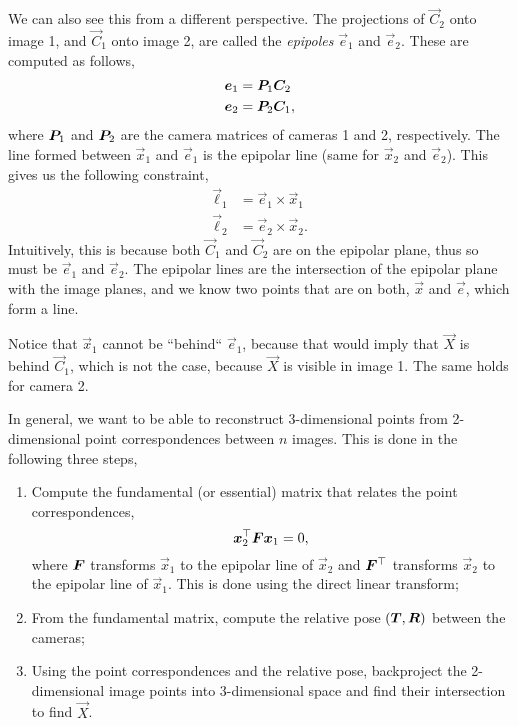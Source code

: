 We can also see this from a different perspective. The projections of
$\vec{C}_2$ onto image 1, and $\vec{C}_1$ onto image 2, are called the
\textit{epipoles} $\vec{e}_1$ and $\vec{e}_2$. These are computed as follows,
\begin{align*}
    \bm{e}_1 & = \bm{P}_1 \bm{C}_2  \\
    \bm{e}_2 & = \bm{P}_2 \bm{C}_1,
\end{align*}
where $\bm{P}_1$ and $\bm{P}_2$ are the camera matrices of cameras 1 and 2,
respectively. The line formed between $\vec{x}_1$ and $\vec{e}_1$ is the
epipolar line (same for $\vec{x}_2$ and $\vec{e}_2$). This gives us the
following constraint,
\begin{align*}
    \vec{\ell}_1 & = \vec{e}_1 \times \vec{x}_1  \\
    \vec{\ell}_2 & = \vec{e}_2 \times \vec{x}_2.
\end{align*}
Intuitively, this is because both $\vec{C}_1$ and $\vec{C}_2$ are on the
epipolar plane, thus so must be $\vec{e}_1$ and $\vec{e}_2$. The epipolar lines
are the intersection of the epipolar plane with the image planes, and we know
two points that are on both, $\vec{x}$ and $\vec{e}$, which form a line.

Notice that $\vec{x}_1$ cannot be ``behind`` $\vec{e}_1$, because that would
imply that $\vec{X}$ is behind $\vec{C}_1$, which is not the case, because
$\vec{X}$ is visible in image 1. The same holds for camera 2.

In general, we want to be able to reconstruct 3-dimensional points from
2-dimensional point correspondences between $n$ images. This is done in the
following three steps,
\begin{enumerate}
    \item Compute the fundamental (or essential) matrix that relates the point
          correspondences, \[
              \bm{x}_2^\top \bm{F} \bm{x}_1 = 0
              ,\]
          where $\bm{F}$ transforms $\vec{x}_1$ to the epipolar line of $\vec{x}_2$
          and $\bm{F}^\top$ transforms $\vec{x}_2$ to the epipolar line of
          $\vec{x}_1$. This is done using the direct linear transform;

    \item From the fundamental matrix, compute the relative pose
          $(\bm{T},\bm{R})$ between the cameras;

    \item Using the point correspondences and the relative pose, backproject the
          2-dimensional image points into 3-dimensional space and find their
          intersection to find $\vec{X}$.

\end{enumerate}

